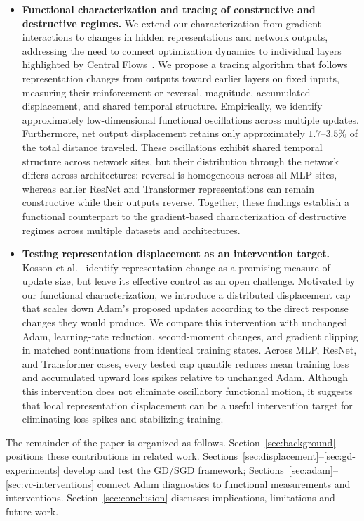 \begin{itemize}
\item \textbf{Functional characterization and tracing of constructive and destructive regimes.} We extend our characterization from gradient interactions to changes in hidden representations and network outputs, addressing the need to connect optimization dynamics to individual layers highlighted by Central Flows~\cite{cohen2025central}. We propose a tracing algorithm that follows representation changes from outputs toward earlier layers on fixed inputs, measuring their reinforcement or reversal, magnitude, accumulated displacement, and shared temporal structure. Empirically, we identify approximately low-dimensional functional oscillations across multiple updates. Furthermore, net output displacement retains only approximately \(1.7\)--\(3.5\%\) of the total distance traveled. These oscillations exhibit shared temporal structure across network sites, but their distribution through the network differs across architectures: reversal is homogeneous across all MLP sites, whereas earlier ResNet and Transformer representations can remain constructive while their outputs reverse. Together, these findings establish a functional counterpart to the gradient-based characterization of destructive regimes across multiple datasets and architectures.

\item \textbf{Testing representation displacement as an intervention target.} Kosson et al.~\cite{kosson2024warmup} identify representation change as a promising measure of update size, but leave its effective control as an open challenge. Motivated by our functional characterization, we introduce a distributed displacement cap that scales down Adam's proposed updates according to the direct response changes they would produce. We compare this intervention with unchanged Adam, learning-rate reduction, second-moment changes, and gradient clipping in matched continuations from identical training states. Across MLP, ResNet, and Transformer cases, every tested cap quantile reduces mean training loss and accumulated upward loss spikes relative to unchanged Adam. Although this intervention does not eliminate oscillatory functional motion, it suggests that local representation displacement can be a useful intervention target for eliminating loss spikes and stabilizing training.

\end{itemize}

The remainder of the paper is organized as follows. Section~\ref{sec:background} positions these contributions in related work. Sections~\ref{sec:displacement}--\ref{sec:gd-experiments} develop and test the GD/SGD framework; Sections~\ref{sec:adam}--\ref{sec:vc-interventions} connect Adam diagnostics to functional measurements and interventions. Section~\ref{sec:conclusion} discusses implications, limitations and future work.
